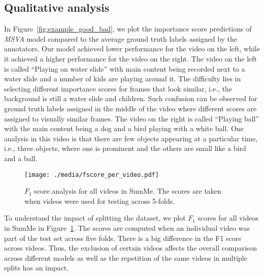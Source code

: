 \documentclass{article}
\begin{document}
\subsection{Qualitative analysis}



In Figure~\ref{fig:example_good_bad}, we plot the importance score predictions of \textit{MSVA} model compared to the average ground truth labels assigned by the annotators. Our model achieved lower performance for the video on the left, while it achieved a higher performance for the video on the right. The video on the left is called ``Playing on water slide'' with main content being recorded next to a water slide and a number of kids are playing around it. The difficulty lies in selecting different importance scores for frames that look similar, i.e., the background is still a water slide and children. Such confusion can be observed for ground truth labels assigned in the middle of the video where different scores are assigned to visually similar frames. 
The video on the right is called ``Playing ball'' with the main content being a dog and a bird playing with a white ball. One analysis in this video is that there are few objects appearing at a particular time, i.e., three objects, where one is prominent and the others are small like a bird and a ball.


\begin{figure}[ht]
\begin{center}
\texttt{[image: ./media/fscore\_per\_video.pdf]}
\caption{$F_{1}$ score analysis for all videos in SumMe. The scores are taken when videos were used for testing across 5-folds.}
\label{fig:video_wise-analysis}
\end{center}
\end{figure}

To understand the impact of splitting the dataset, we plot $F_{1}$ scores for all videos in SumMe in Figure~\ref{fig:video_wise-analysis}. The scores are computed when an individual video was part of the test set across five folds. There is a big difference in the F1 score across videos. Thus, the exclusion of certain videos affects the overall comparison across different models as well as the repetition of the same videos in multiple splits has an impact. 
\end{document}
